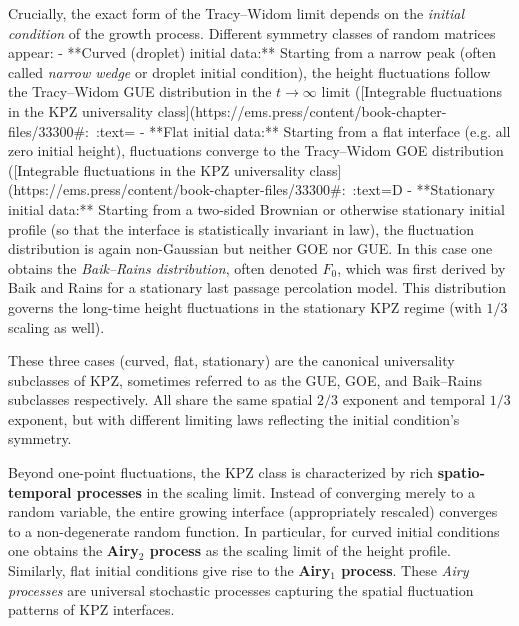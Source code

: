 \documentclass[letterpaper,11pt,oneside,reqno]{article}
\numberwithin{equation}{section}
\theoremstyle{definition}
\begin{document}
Crucially, the exact form of the Tracy–Widom limit depends on the \emph{initial condition} of the growth process. Different symmetry classes of random matrices appear:
- **Curved (droplet) initial data:** Starting from a narrow peak (often called \emph{narrow wedge} or droplet initial condition), the height fluctuations follow the Tracy–Widom GUE distribution in the $t\to\infty$ limit ([Integrable fluctuations in the KPZ universality class](https://ems.press/content/book-chapter-files/33300#:~:text=%
- **Flat initial data:** Starting from a flat interface (e.g. all zero initial height), fluctuations converge to the Tracy–Widom GOE distribution ([Integrable fluctuations in the KPZ universality class](https://ems.press/content/book-chapter-files/33300#:~:text=D%
- **Stationary initial data:** Starting from a two-sided Brownian or otherwise stationary initial profile (so that the interface is statistically invariant in law), the fluctuation distribution is again non-Gaussian but neither GOE nor GUE. In this case one obtains the \emph{Baik–Rains distribution}, often denoted $F_0$, which was first derived by Baik and Rains for a stationary last passage percolation model. This distribution governs the long-time height fluctuations in the stationary KPZ regime (with $1/3$ scaling as well).

These three cases (curved, flat, stationary) are the canonical universality subclasses of KPZ, sometimes referred to as the GUE, GOE, and Baik–Rains subclasses respectively. All share the same spatial $2/3$ exponent and temporal $1/3$ exponent, but with different limiting laws reflecting the initial condition's symmetry.

Beyond one-point fluctuations, the KPZ class is characterized by rich \textbf{spatio-temporal processes} in the scaling limit. Instead of converging merely to a random variable, the entire growing interface (appropriately rescaled) converges to a non-degenerate random function. In particular, for curved initial conditions one obtains the \textbf{Airy$_2$ process} as the scaling limit of the height profile. Similarly, flat initial conditions give rise to the \textbf{Airy$_1$ process}. These \emph{Airy processes} are universal stochastic processes capturing the spatial fluctuation patterns of KPZ interfaces.
\end{document}
